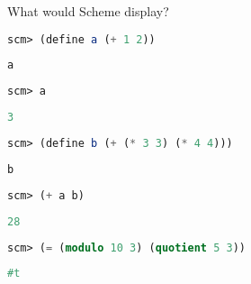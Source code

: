 \question What would Scheme display?

\begin{lstlisting}[language=Scheme]
scm> (define a (+ 1 2))
\end{lstlisting}
\begin{solution}[0.15in]
\begin{lstlisting}[language=Scheme]
a
\end{lstlisting}
\end{solution}

\begin{lstlisting}[language=Scheme]
scm> a
\end{lstlisting}
\begin{solution}[0.15in]
\begin{lstlisting}[language=Scheme]
3
\end{lstlisting}
\end{solution}

\begin{lstlisting}[language=Scheme]
scm> (define b (+ (* 3 3) (* 4 4)))
\end{lstlisting}
\begin{solution}[0.15in]
\begin{lstlisting}[language=Scheme]
b
\end{lstlisting}
\end{solution}

\begin{lstlisting}[language=Scheme]
scm> (+ a b)
\end{lstlisting}
\begin{solution}[0.15in]
\begin{lstlisting}[language=Scheme]
28
\end{lstlisting}
\end{solution}

\begin{lstlisting}[language=Scheme]
scm> (= (modulo 10 3) (quotient 5 3))
\end{lstlisting}
\begin{solution}[0.15in]
\begin{lstlisting}[language=Scheme]
#t
\end{lstlisting}
\end{solution}



